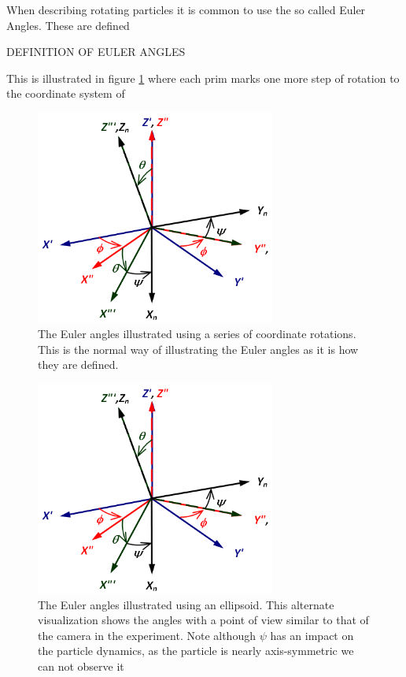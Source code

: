 When describing rotating particles it is common to use the so called Euler Angles. These are defined 

DEFINITION OF EULER ANGLES

This is illustrated in figure \ref{fig:eulerangles} where each prim marks one more step of rotation to the coordinate system of

\begin{figure}
\begin{center}
\includegraphics[width=0.7\textwidth]{figures/theory/eulerangles.png}
\end{center}
\caption{The Euler angles illustrated using a series of coordinate rotations. This is the normal way of illustrating the Euler angles as it is how they are defined.}
\label{fig:eulerangles}
\end{figure}


\begin{figure}
\begin{center}
\includegraphics[width=0.7\textwidth]{figures/theory/EulerAngles.png}
\end{center}
\caption{The Euler angles illustrated using an ellipsoid. This alternate visualization shows the angles with a point of view similar to that of the camera in the experiment. Note although $\psi$ has an impact on the particle dynamics, as the particle is nearly axis-symmetric we can not observe it}
\label{fig:eulerparticle}
\end{figure}


